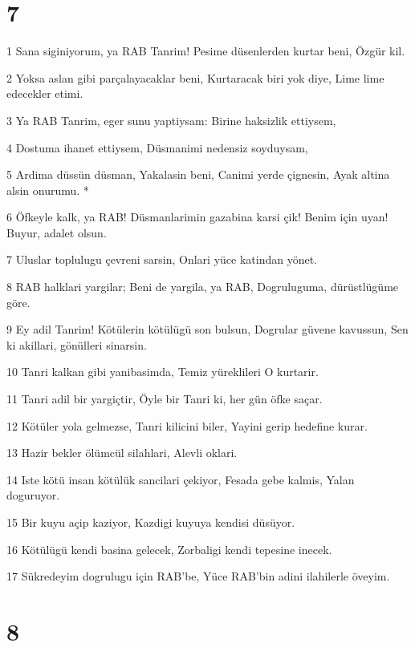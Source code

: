 \chapter{7}

\par 1 Sana siginiyorum, ya RAB Tanrim! Pesime düsenlerden kurtar beni, Özgür kil.
\par 2 Yoksa aslan gibi parçalayacaklar beni, Kurtaracak biri yok diye, Lime lime edecekler etimi.
\par 3 Ya RAB Tanrim, eger sunu yaptiysam: Birine haksizlik ettiysem,
\par 4 Dostuma ihanet ettiysem, Düsmanimi nedensiz soyduysam,
\par 5 Ardima düssün düsman, Yakalasin beni, Canimi yerde çignesin, Ayak altina alsin onurumu. *
\par 6 Öfkeyle kalk, ya RAB! Düsmanlarimin gazabina karsi çik! Benim için uyan! Buyur, adalet olsun.
\par 7 Uluslar toplulugu çevreni sarsin, Onlari yüce katindan yönet.
\par 8 RAB halklari yargilar; Beni de yargila, ya RAB, Dogruluguma, dürüstlügüme göre.
\par 9 Ey adil Tanrim! Kötülerin kötülügü son bulsun, Dogrular güvene kavussun, Sen ki akillari, gönülleri sinarsin.
\par 10 Tanri kalkan gibi yanibasimda, Temiz yüreklileri O kurtarir.
\par 11 Tanri adil bir yargiçtir, Öyle bir Tanri ki, her gün öfke saçar.
\par 12 Kötüler yola gelmezse, Tanri kilicini biler, Yayini gerip hedefine kurar.
\par 13 Hazir bekler ölümcül silahlari, Alevli oklari.
\par 14 Iste kötü insan kötülük sancilari çekiyor, Fesada gebe kalmis, Yalan doguruyor.
\par 15 Bir kuyu açip kaziyor, Kazdigi kuyuya kendisi düsüyor.
\par 16 Kötülügü kendi basina gelecek, Zorbaligi kendi tepesine inecek.
\par 17 Sükredeyim dogrulugu için RAB'be, Yüce RAB'bin adini ilahilerle öveyim.

\chapter{8}

